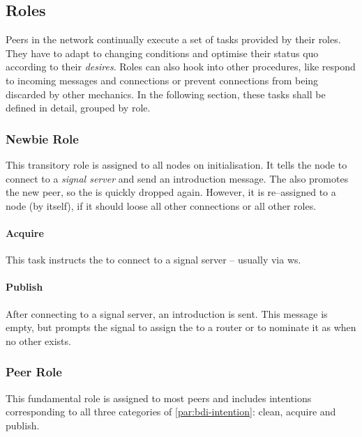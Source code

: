 \subsection{Roles}\label{sec:design-roles}
Peers in the network continually execute a set of tasks provided by their roles. They have to adapt to changing conditions and optimise their status quo according to their \textit{desires}. Roles can also hook into other procedures, like respond to incoming messages and connections or prevent connections from being discarded by other mechanics. In the following section, these tasks shall be defined in detail, grouped by role.

\subsubsection{Newbie Role}\label{sec:design-roles-newbie}
This transitory role is assigned to all nodes on initialisation. It tells the node to connect to a \textit{signal server} and send an introduction message. The \signalRole also promotes the new peer, so the \newbieRole is quickly dropped again. However, it is re–assigned to a node (by itself), if it should loose all other connections or all other roles.

\paragraph{Acquire}
\begin{itemize}
     This task instructs the \newbieRole to connect to a signal server – usually via \gls{ws}.
\end{itemize}

\paragraph{Publish}
\begin{itemize}
     After connecting to a signal server, an introduction is sent. This message is empty, but prompts the signal to assign the \newbieRole to a router or to nominate it as \routerRole when no other \routerRole exists.
\end{itemize}

\subsubsection{Peer Role}\label{sec:design-roles-peer}
This fundamental role is assigned to most peers and includes intentions corresponding to all three categories of \vref{par:bdi-intention}: clean, acquire and publish.

